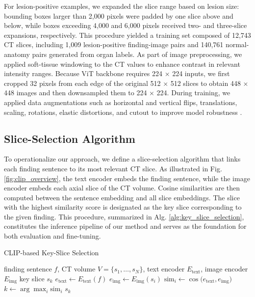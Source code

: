 \documentclass[bioengineering,article,submit,pdftex,moreauthors]{Definitions/mdpi}
\begin{document}
For lesion-positive examples, we expanded the slice range based on lesion size: bounding boxes larger than 2,000 pixels were padded by one slice above and below, while boxes exceeding 4,000 and 6,000 pixels received two- and three-slice expansions, respectively. 
This procedure yielded a training set composed of 12,743 CT slices, including 1,009 lesion-positive finding-image pairs and 140,761 normal-anatomy pairs generated from organ labels.
As part of image preprocessing, we applied soft-tissue windowing to the CT values to enhance contrast in relevant intensity ranges. 
Because ViT backbone requires 224 × 224 inputs, we first cropped 32 pixels from each edge of the original 512 × 512 slices to obtain 448 × 448 images and then downsampled them to 224 × 224. 
During training, we applied data augmentations such as horizontal and vertical flips, translations, scaling, rotations, elastic distortions, and cutout to improve model robustness \cite{devries_improved_2017}.


\subsection{Slice-Selection Algorithm}  
To operationalize our approach, we define a slice-selection algorithm that links each finding sentence to its most relevant CT slice. 
As illustrated in Fig. \ref{fig:clip_overview}, the text encoder embeds the finding sentence, while the image encoder embeds each axial slice of the CT volume. 
Cosine similarities are then computed between the sentence embedding and all slice embeddings. 
The slice with the highest similarity score is designated as the key slice corresponding to the given finding. 
This procedure, summarized in Alg. \ref{alg:key_slice_selection}, constitutes the inference pipeline of our method and serves as the foundation for both evaluation and fine-tuning.

\begin{algorithm}
  \caption{CLIP-based Key-Slice Selection}
  \label{alg:key_slice_selection}
  \begin{algorithmic}[1]
    \REQUIRE finding sentence $f$, CT volume $V = \{s_1, \dots, s_N\}$, text encoder $E_{\mathrm{text}}$, image encoder $E_{\mathrm{img}}$
    \ENSURE key slice $s_k$
    \STATE $e_{\mathrm{text}} \leftarrow E_{\mathrm{text}}(f)$ 
      \STATE $e_{\mathrm{img}} \leftarrow E_{\mathrm{img}}(s_i)$ 
      \STATE $\mathrm{sim}_i \leftarrow \cos\bigl(e_{\mathrm{text}}, e_{\mathrm{img}}\bigr)$ 
    \ENDFOR
    \STATE $k \leftarrow \arg\max_i \mathrm{sim}_i$ 
    \RETURN $s_k$
  \end{algorithmic}
\end{algorithm}
\end{document}
